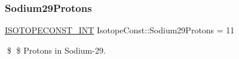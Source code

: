 \subsubsection{\texorpdfstring{Sodium29\+Protons}{Sodium29Protons}}
{\footnotesize\ttfamily \mbox{\hyperlink{group___isotope_const-_macros_ga5f18360b3e99483a35c32d789e62621c}{I\+S\+O\+T\+O\+P\+E\+C\+O\+N\+S\+T\+\_\+\+I\+NT}} Isotope\+Const\+::\+Sodium29\+Protons = 11}

\$ \$ Protons in Sodium-\/29. 